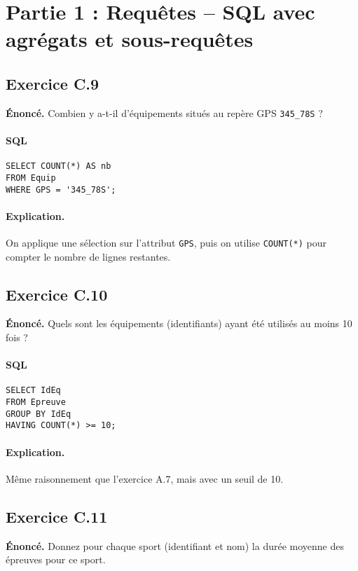 \documentclass[11pt]{article}
\begin{document}
\section*{Partie 1 : Requêtes -- SQL avec agrégats et sous-requêtes}

\subsection*{Exercice C.9}
\textbf{Énoncé.} Combien y a-t-il d'équipements situés au repère GPS \texttt{345\_78S} ?\\

\paragraph{SQL}
\begin{verbatim}
SELECT COUNT(*) AS nb
FROM Equip
WHERE GPS = '345_78S';
\end{verbatim}

\paragraph{Explication.}
On applique une sélection sur l'attribut \texttt{GPS}, puis on utilise \texttt{COUNT(*)} pour compter le nombre de lignes restantes.

\subsection*{Exercice C.10}
\textbf{Énoncé.} Quels sont les équipements (identifiants) ayant été utilisés au moins 10 fois ?\\

\paragraph{SQL}
\begin{verbatim}
SELECT IdEq
FROM Epreuve
GROUP BY IdEq
HAVING COUNT(*) >= 10;
\end{verbatim}

\paragraph{Explication.}
Même raisonnement que l'exercice A.7, mais avec un seuil de 10.

\subsection*{Exercice C.11}
\textbf{Énoncé.} Donnez pour chaque sport (identifiant et nom) la durée moyenne des épreuves pour ce sport.\\
\end{document}
